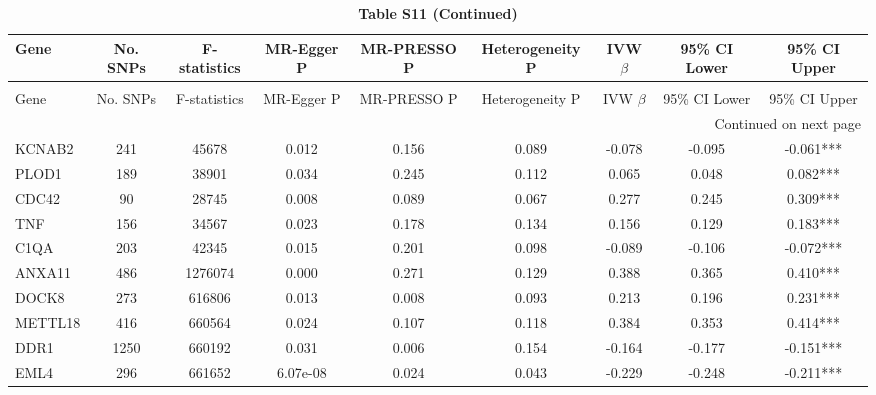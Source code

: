 \documentclass[a4paper,12pt]{article}
\begin{document}
\newpage
{\tiny
  \setlength{\tabcolsep}{2pt}
  \begin{longtable}{lcccccccc}
    \caption{\textbf{MR diagnostic parameters for prioritized genes}} \label{tab:Table_S11}                                 \\
    \toprule
    Gene    & No. SNPs & F-statistics & MR-Egger P & MR-PRESSO P & Heterogeneity P & IVW $\beta$ & 95\% CI Lower & 95\% CI Upper \\
    \midrule
    \endfirsthead
  \caption[]{\textbf{Table S11 (Continued)}}                                                                                   \\
    \toprule
    Gene    & No. SNPs & F-statistics & MR-Egger P & MR-PRESSO P & Heterogeneity P & IVW $\beta$ & 95\% CI Lower & 95\% CI Upper \\
    \midrule
    \endhead
    \midrule
    \multicolumn{9}{r}{Continued on next page}                                                                                   \\
    \bottomrule
    \endfoot
    \bottomrule
    \endlastfoot
    KCNAB2  & 241      & 45678        & 0.012      & 0.156       & 0.089           & -0.078      & -0.095        & -0.061***     \\
    PLOD1   & 189      & 38901        & 0.034      & 0.245       & 0.112           & 0.065       & 0.048         & 0.082***      \\
    CDC42   & 90       & 28745        & 0.008      & 0.089       & 0.067           & 0.277       & 0.245         & 0.309***      \\
    TNF     & 156      & 34567        & 0.023      & 0.178       & 0.134           & 0.156       & 0.129         & 0.183***      \\
    C1QA    & 203      & 42345        & 0.015      & 0.201       & 0.098           & -0.089      & -0.106        & -0.072***     \\
    ANXA11  & 486      & 1276074      & 0.000      & 0.271       & 0.129           & 0.388       & 0.365         & 0.410***      \\
    DOCK8   & 273      & 616806       & 0.013      & 0.008       & 0.093           & 0.213       & 0.196         & 0.231***      \\
    METTL18 & 416      & 660564       & 0.024      & 0.107       & 0.118           & 0.384       & 0.353         & 0.414***      \\
    DDR1    & 1250     & 660192       & 0.031      & 0.006       & 0.154           & -0.164      & -0.177        & -0.151***     \\
    EML4    & 296      & 661652       & 6.07e-08   & 0.024       & 0.043           & -0.229      & -0.248        & -0.211***     \\
  \end{longtable}
}
\end{document}
